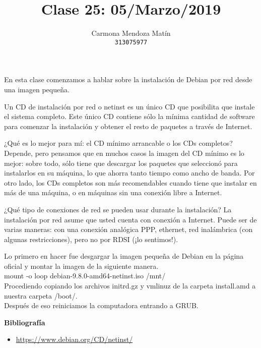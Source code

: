 \documentclass[11pt, a4paper]{report}
\begin{document}
\title{Clase 25: 05/Marzo/2019}
\author{
  Carmona Mendoza Mat\'in\\
  \texttt{313075977}
}
\date{}
\maketitle

En esta clase comenzamos a hablar sobre la instalación de Debian por red
desde una imagen pequeña.

Un CD de instalación por red o netinst es un único CD que posibilita que
instale el sistema completo. Este único CD contiene sólo la mínima
cantidad de software para comenzar la instalación y obtener el resto de
paquetes a través de Internet.

¿Qué es lo mejor para mí: el CD mínimo arrancable o los CDs completos?
Depende, pero pensamos que en muchos casos la imagen del CD mínimo es lo
mejor: sobre todo, sólo tiene que descargar los paquetes que seleccionó
para instalarlos en su máquina, lo que ahorra tanto tiempo como ancho de
banda. Por otro lado, los CDs completos son más recomendables cuando
tiene que instalar en más de una máquina, o en máquinas sin una conexión
libre a Internet.

¿Qué tipo de conexiones de red se pueden usar durante la instalación? La
instalación por red asume que usted cuenta con conexión a Internet. Puede
ser de varias maneras: con una conexión analógica PPP, ethernet, red
inalámbrica (con algunas restricciones), pero no por RDSI (¡lo sentimos!).

Lo primero en hacer fue desgargar la imagen pequeña de Debian en la
página oficial y montar la imagen de la siguiente manera. \\

mount -o loop debian-9.8.0-amd64-netinst.iso /mnt/ \\

Procediendo copiando los archivos initrd.gz y vmlinuz de la carpeta
install.amd a nuestra carpeta /boot/. \\

Después de eso reiniciamos la computadora entrando a GRUB.

\newpage

\textbf{Bibliografía} \\

\begin{itemize}

\item  \url{https://www.debian.org/CD/netinst/}
\end{itemize}
\end{document}
